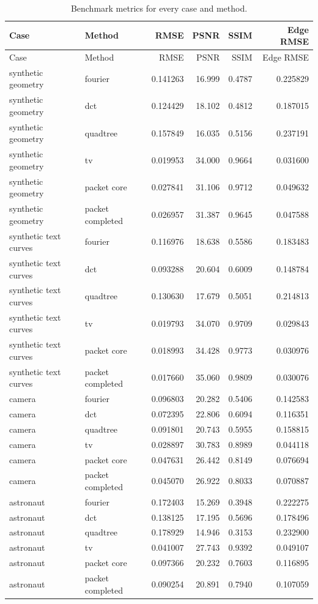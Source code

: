 \begin{longtable}{llrrrr}
\caption{Benchmark metrics for every case and method.}\label{tab:benchmark}\\
\toprule Case & Method & RMSE & PSNR & SSIM & Edge RMSE\\\midrule
\endfirsthead\toprule Case & Method & RMSE & PSNR & SSIM & Edge RMSE\\\midrule\endhead
synthetic geometry & fourier & 0.141263 & 16.999 & 0.4787 & 0.225829\\
synthetic geometry & dct & 0.124429 & 18.102 & 0.4812 & 0.187015\\
synthetic geometry & quadtree & 0.157849 & 16.035 & 0.5156 & 0.237191\\
synthetic geometry & tv & 0.019953 & 34.000 & 0.9664 & 0.031600\\
synthetic geometry & packet core & 0.027841 & 31.106 & 0.9712 & 0.049632\\
synthetic geometry & packet completed & 0.026957 & 31.387 & 0.9645 & 0.047588\\
synthetic text curves & fourier & 0.116976 & 18.638 & 0.5586 & 0.183483\\
synthetic text curves & dct & 0.093288 & 20.604 & 0.6009 & 0.148784\\
synthetic text curves & quadtree & 0.130630 & 17.679 & 0.5051 & 0.214813\\
synthetic text curves & tv & 0.019793 & 34.070 & 0.9709 & 0.029843\\
synthetic text curves & packet core & 0.018993 & 34.428 & 0.9773 & 0.030976\\
synthetic text curves & packet completed & 0.017660 & 35.060 & 0.9809 & 0.030076\\
camera & fourier & 0.096803 & 20.282 & 0.5406 & 0.142583\\
camera & dct & 0.072395 & 22.806 & 0.6094 & 0.116351\\
camera & quadtree & 0.091801 & 20.743 & 0.5955 & 0.158815\\
camera & tv & 0.028897 & 30.783 & 0.8989 & 0.044118\\
camera & packet core & 0.047631 & 26.442 & 0.8149 & 0.076694\\
camera & packet completed & 0.045070 & 26.922 & 0.8033 & 0.070887\\
astronaut & fourier & 0.172403 & 15.269 & 0.3948 & 0.222275\\
astronaut & dct & 0.138125 & 17.195 & 0.5696 & 0.178496\\
astronaut & quadtree & 0.178929 & 14.946 & 0.3153 & 0.232900\\
astronaut & tv & 0.041007 & 27.743 & 0.9392 & 0.049107\\
astronaut & packet core & 0.097366 & 20.232 & 0.7603 & 0.116895\\
astronaut & packet completed & 0.090254 & 20.891 & 0.7940 & 0.107059\\
\bottomrule\end{longtable}

